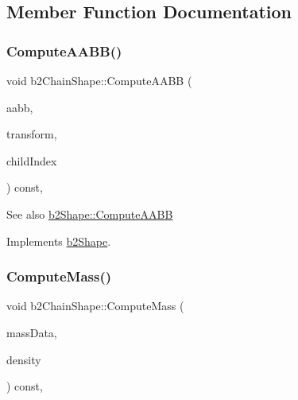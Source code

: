\subsection{Member Function Documentation}
\mbox{\label{classb2_chain_shape_ae1d7470ce8d32e92d27c149ab45f5468}} 
\subsubsection{\texorpdfstring{Compute\+A\+A\+B\+B()}{ComputeAABB()}}
{\footnotesize\ttfamily void b2\+Chain\+Shape\+::\+Compute\+A\+A\+BB (\begin{DoxyParamCaption}\item[{\hyperlink{structb2_a_a_b_b}{b2\+A\+A\+BB} $\ast$}]{aabb,  }\item[{const \hyperlink{structb2_transform}{b2\+Transform} \&}]{transform,  }\item[{int32}]{child\+Index }\end{DoxyParamCaption}) const\hspace{0.3cm}{\ttfamily [override]}, {\ttfamily [virtual]}}

\begin{DoxySeeAlso}{See also}
\hyperlink{classb2_shape_a88e9807fab0c8ca9a98d8926e50a1411}{b2\+Shape\+::\+Compute\+A\+A\+BB} 
\end{DoxySeeAlso}


Implements \hyperlink{classb2_shape_a88e9807fab0c8ca9a98d8926e50a1411}{b2\+Shape}.

\mbox{\label{classb2_chain_shape_aad3671d6eab61f6b26e2f1b6ac50bb98}} 
\subsubsection{\texorpdfstring{Compute\+Mass()}{ComputeMass()}}
{\footnotesize\ttfamily void b2\+Chain\+Shape\+::\+Compute\+Mass (\begin{DoxyParamCaption}\item[{\hyperlink{structb2_mass_data}{b2\+Mass\+Data} $\ast$}]{mass\+Data,  }\item[{float32}]{density }\end{DoxyParamCaption}) const\hspace{0.3cm}{\ttfamily [override]}, {\ttfamily [virtual]}}

